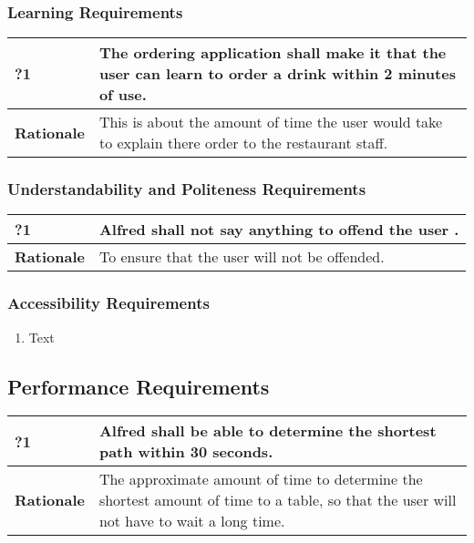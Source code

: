 \documentclass [11pt]{article}
\begin{document}
\subsubsection{Learning Requirements }

\begin{longtable}{| p{ } | p{ } | }\hline 
	\rowcolor{tableCell}\textbf{?1} & The ordering application shall make it that the user can learn to order a drink within 2 minutes of use. \\ \hline
	\textbf{Rationale} & This is about the amount of time the user would take to explain there order to the restaurant staff.\\ \hline 
\end{longtable}

\subsubsection{Understandability and Politeness Requirements}

\begin{longtable}{| p{ } | p{ } | }\hline 
	\rowcolor{tableCell}\textbf{?1} & Alfred shall not say anything to offend the user . \\ \hline
	\textbf{Rationale} & To ensure that the user will not be offended.\\ \hline 
\end{longtable}
\subsubsection{Accessibility Requirements }
	\begin{enumerate}[label=\textbf{(\roman*)}]
		\item Text
	\end{enumerate}
 
\subsection{Performance Requirements}
\begin{longtable}{| p{ } | p{ } | }\hline 
	\rowcolor{tableCell}\textbf{?1} & Alfred shall be able to determine the shortest path within 30 seconds. \\ \hline
	\textbf{Rationale} & The approximate amount of time to determine the shortest amount of time to a table, so that the user will not have to wait a long time.\\ \hline 
\end{longtable}
\end{document}

